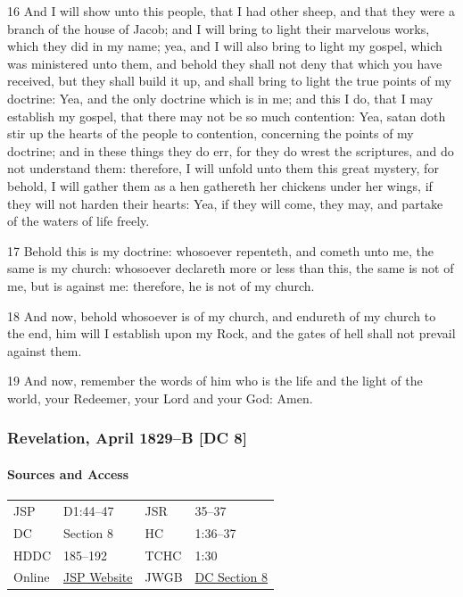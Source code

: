 				16 And I will show unto this people, that I had other sheep, and that they were a branch of the house of Jacob; and I will bring to light their marvelous works, which they did in my name; yea, and I will also bring to light my gospel, which was ministered unto them, and behold they shall not deny that which you have received, but they shall build it up, and shall bring to light the true points of my doctrine: Yea, and the only doctrine which is in me; and this I do, that I may establish my gospel, that there may not be so much contention: Yea, satan doth stir up the hearts of the people to contention, concerning the points of my doctrine; and in these things they do err, for they do wrest the scriptures, and do not understand them: therefore, I will unfold unto them this great mystery, for behold, I will gather them as a hen gathereth her chickens under her wings, if they will not harden their hearts: Yea, if they will come, they may, and partake of the waters of life freely.

				17 Behold this is my doctrine: whosoever repenteth, and cometh unto me, the same is my church: whosoever declareth more or less than this, the same is not of me, but is against me: therefore, he is not of my church.

				18 And now, behold whosoever is of my church, and endureth of my church to the end, him will I establish upon my Rock, and the gates of hell shall not prevail against them.

				19 And now, remember the words of him who is the life and the light of the world, your Redeemer, your Lord and your God: Amen.
			
		\subsubsection{Revelation, April 1829--B [DC 8]}
			\label{EMS-1828-1829-JS-APR-1829-B}
			
			\paragraph{Sources and Access}

				\begin{tabular}{p{1in}p{1.5in}p{1in}p{1.5in}}
				JSP	 	& D1:44--47		& JSR 		& 35--37	 \\  
				DC	 	& Section 8 	& HC 		& 1:36--37	 \\
				HDDC 	& 185--192 		& TCHC 		& 1:30		 \\
				Online  & \href{https://www.josephsmithpapers.org/paper-summary/revelation-april-1829-b-dc-8/1}{JSP Website} & 
				JWGB	& \hyperref[DC8]{DC Section 8} \\
				\end{tabular}
			
